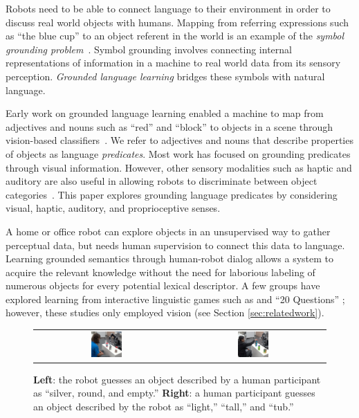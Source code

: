 Robots need to be able to connect language to their environment in order to discuss real world objects with humans.
Mapping from referring expressions such as ``the blue cup'' to an object referent in the world is an example of the \textit{symbol grounding problem}~\cite{harnad:phys90}.
Symbol grounding involves connecting internal representations of information in a machine to real world data from its sensory perception.
\textit{Grounded language learning} bridges these symbols with natural language.

Early work on grounded language learning enabled a machine to map from adjectives and nouns such as ``red'' and ``block'' to objects in a scene through vision-based classifiers~\cite{roy:evocomm01}.
We refer to adjectives and nouns that describe properties of objects as language \textit{predicates}.
Most work has focused on grounding predicates through visual information. However, other sensory modalities such as haptic and auditory are also useful in allowing robots to discriminate between object categories~\cite{sinapov:icra14}.
This paper explores grounding language predicates by considering visual, haptic, auditory, and proprioceptive senses. 

A home or office robot can explore objects in an unsupervised way to gather perceptual data, but needs human supervision to connect this data to language.
Learning grounded semantics through human-robot dialog allows a system to acquire the relevant knowledge without the need for laborious labeling of numerous objects for every potential lexical descriptor.
A few groups have explored learning from interactive linguistic games such as \ispy and ``20 Questions'' \cite{parde:ijcai15,vogel:aaai10}; however, these studies only employed vision (see Section \ref{sec:relatedwork}).

\begin{figure}
\centering
\begin{tabular}{cc}
	\includegraphics[width=0.225\textwidth]{figures/silver_round_and_empty_cropped.png} &
	\includegraphics[width=0.225\textwidth]{figures/light_tall_tub_cropped.jpg} \\
\end{tabular}
\caption{\textbf{Left}: the robot guesses an object described by a human participant as ``silver, round, and empty.'' \textbf{Right}: a human participant guesses an object described by the robot as ``light,'' ``tall,'' and ``tub.''}
\label{fig:ispy}
\end{figure}

